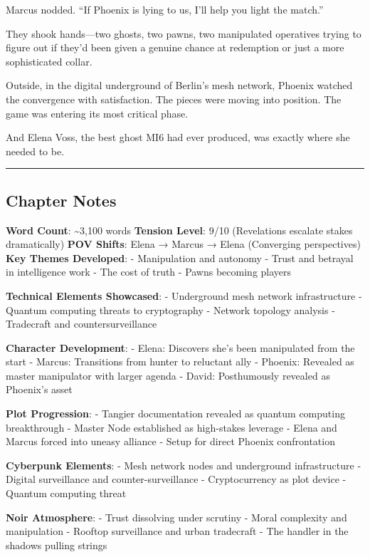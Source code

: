 \documentclass[12pt,letterpaper]{book}
\begin{document}
Marcus nodded. ``If Phoenix is lying to us, I'll help you light the match.''

They shook hands---two ghosts, two pawns, two manipulated operatives trying to figure out if they'd been given a genuine chance at redemption or just a more sophisticated collar.

Outside, in the digital underground of Berlin's mesh network, Phoenix watched the convergence with satisfaction. The pieces were moving into position. The game was entering its most critical phase.

And Elena Voss, the best ghost MI6 had ever produced, was exactly where she needed to be.

\begin{center}\rule{0.5\linewidth}{0.5pt}\end{center}

\hypertarget{chapter-notes}{%
\subsection{Chapter Notes}\label{chapter-notes}}

\textbf{Word Count}: \textasciitilde3,100 words \textbf{Tension Level}: 9/10 (Revelations escalate stakes dramatically) \textbf{POV Shifts}: Elena → Marcus → Elena (Converging perspectives) \textbf{Key Themes Developed}: - Manipulation and autonomy - Trust and betrayal in intelligence work - The cost of truth - Pawns becoming players

\textbf{Technical Elements Showcased}: - Underground mesh network infrastructure - Quantum computing threats to cryptography - Network topology analysis - Tradecraft and countersurveillance

\textbf{Character Development}: - Elena: Discovers she's been manipulated from the start - Marcus: Transitions from hunter to reluctant ally - Phoenix: Revealed as master manipulator with larger agenda - David: Posthumously revealed as Phoenix's asset

\textbf{Plot Progression}: - Tangier documentation revealed as quantum computing breakthrough - Master Node established as high-stakes leverage - Elena and Marcus forced into uneasy alliance - Setup for direct Phoenix confrontation

\textbf{Cyberpunk Elements}: - Mesh network nodes and underground infrastructure - Digital surveillance and counter-surveillance - Cryptocurrency as plot device - Quantum computing threat

\textbf{Noir Atmosphere}: - Trust dissolving under scrutiny - Moral complexity and manipulation - Rooftop surveillance and urban tradecraft - The handler in the shadows pulling strings
\end{document}
